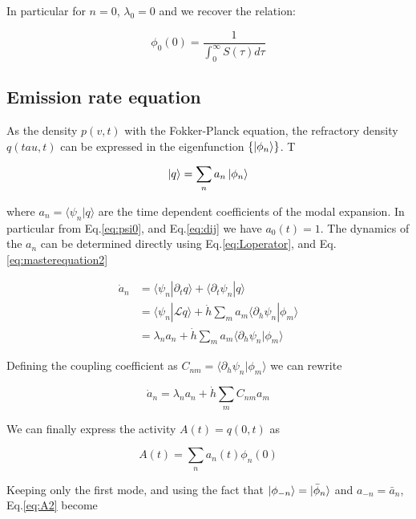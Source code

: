 \documentclass[a4paper,11pt,twoside]{article}
\numberwithin{equation}{section}
\begin{document}
In particular for $n=0$, $\lambda_0=0$ and we recover the relation:

\begin{equation}
\phi_0(0) = \frac{1}{\int_0^{\infty}S(\tau)d\tau}
\end{equation}

\subsection{Emission rate equation}

As the density $p(v,t)$ with the Fokker-Planck equation, the refractory density $q(tau,t)$ can be expressed in the eigenfunction  $ \{\ket{\phi_n}\}$. T

\begin{equation}
\label{eq:q}
\ket{q}=\sum_na_n\ket{\phi_n}
\end{equation}

where $a_n=\langle \psi_n | q\rangle$ are the time dependent coefficients of the modal expansion. In particular from Eq.\eqref{eq:psi0}, and Eq.\eqref{eq:dij} we have $a_0(t)=1$. The dynamics of the $a_n$ can be determined directly using Eq.\eqref{eq:Loperator}, and Eq.\eqref{eq:masterequation2}

\begin{align}
\dot{a}_n&=\langle\psi_n|\partial_t q\rangle+\langle\partial_t\psi_n|q\rangle \nonumber \\
&=\langle\psi_n|\mathcal{L}q\rangle+  \dot{h}\sum_ma_m\langle\partial_h\psi_n|\phi_m \rangle \nonumber \\
&=\lambda_n a_n +  \dot{h}\sum_ma_m\langle\partial_h\psi_n|\phi_m \rangle 
\end{align}

Defining the coupling coefficient as $C_{nm}=\langle\partial_h\psi_n|\phi_m \rangle $ we can rewrite

\begin{equation}
\dot{a}_n=\lambda_n a_n +  \dot{h}\sum_mC_{nm}a_m 
\end{equation}



We can finally express the activity $A(t)=q(0,t)$ as

\begin{equation}
\label{eq:A2}
A(t)=\sum_na_n(t)\phi_n(0)
\end{equation}

Keeping only the first mode, and using the fact that $\ket{\phi_{-n}}=\ket{\bar{\phi}_n}$ and $a_{-n}=\bar{a}_n$,  Eq.\eqref{eq:A2} become
\end{document}
